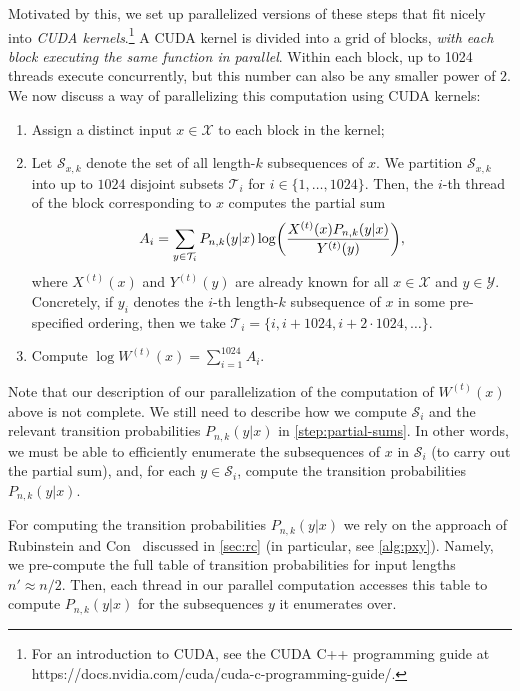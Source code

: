 \documentclass[11pt]{article}
\newcommand{\cS}{\mathcal{S}}
\newcommand{\cT}{\mathcal{T}}
\newcommand{\cX}{\mathcal{X}}
\newcommand{\cY}{\mathcal{Y}}
\let\originalleft\left
\let\originalright\right
\renewcommand{\left}{\mathopen{}\mathclose\bgroup\originalleft}
\renewcommand{\right}{\aftergroup\egroup\originalright}
\begin{document}
Motivated by this, we set up parallelized versions of these steps that fit nicely into \emph{CUDA kernels}.\footnote{For an introduction to CUDA, see the CUDA C++ programming guide at https://docs.nvidia.com/cuda/cuda-c-programming-guide/.} 
A CUDA kernel is divided into a grid of blocks, \emph{with each block executing the same function in parallel}.  
Within each block, up to 1024 threads execute concurrently, but this number can also be any smaller power of $2$. 
We now discuss a way of parallelizing this computation using CUDA kernels:
\begin{enumerate}
    \item Assign a distinct input $x\in\cX$ to each block in the kernel;

    \item \label{step:partial-sums} Let $\cS_{x,k}$ denote the set of all length-$k$ subsequences of $x$.
    We partition $\cS_{x,k}$ into up to $1024$ disjoint subsets $\cT_i$ for $i\in\{1,\dots,1024\}$.
    Then, the $i$-th thread of the block corresponding to $x$ computes the partial sum
    \begin{equation*}
        A_i=\sum_{y\in\cT_i}P_{n,k}(y|x) \log\left(\frac{X^{(t)}(x) P_{n,k}(y|x)}{Y^{(t)}(y)}\right),
    \end{equation*}
    where $X^{(t)}(x)$ and $Y^{(t)}(y)$ are already known for all $x\in\cX$ and $y\in\cY$.
    Concretely, if $y_i$ denotes the $i$-th length-$k$ subsequence of $x$ in some pre-specified ordering, then we take $\cT_i=\{i,i+1024,i+2\cdot 1024,\dots\}$.

    \item Compute $\log W^{(t)}(x)=\sum_{i=1}^{1024} A_i$.
\end{enumerate}



Note that our description of our parallelization of the computation of $W^{(t)}(x)$ above is not complete.
We still need to describe how we compute $\cS_i$ and the relevant transition probabilities $P_{n,k}(y|x)$ in \cref{step:partial-sums}.
In other words, we must be able to efficiently enumerate the subsequences of $x$ in $\cS_i$ (to carry out the partial sum), and, for each $y\in\cS_i$, compute the transition probabilities $P_{n,k}(y|x)$.

For computing the transition probabilities $P_{n,k}(y|x)$ we rely on the approach of Rubinstein and Con~\cite{RC23} discussed in \cref{sec:rc} (in particular, see \cref{alg:pxy}).
Namely, we pre-compute the full table of transition probabilities for input lengths $n'\approx n/2$.
Then, each thread in our parallel computation accesses this table to compute $P_{n,k}(y|x)$ for the subsequences $y$ it enumerates over.
\end{document}
